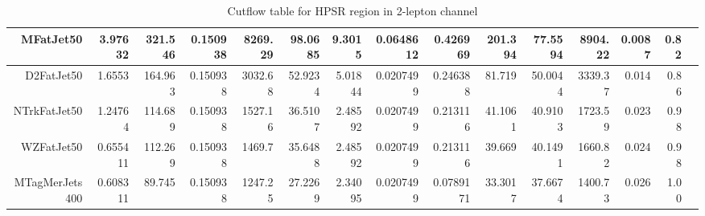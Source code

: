 \begin{table}[ht!]
\begin{center}
{\begin{tabular}{ r ||  r  r  r  r  r  r  r  r  r  || r r r r r |}
MFatJet50 & 3.97632 & 321.546 & 0.150938 & 8269.29 & 98.0685 & 9.3015 & 0.0648612 & 0.426969 & 201.394 & 77.5594 &8904.22&0.0087 & 0.82\tabularnewline \hline
D2FatJet50 & 1.6553 & 164.963 & 0.150938 & 3032.68 & 52.9234 & 5.01844 & 0.0207499 & 0.246388 & 81.719 & 50.0044 & 3339.37&0.014 & 0.86\tabularnewline \hline
NTrkFatJet50 & 1.24764 & 114.689 & 0.150938 & 1527.16 & 36.5107 & 2.48592 & 0.0207499 & 0.213116 & 41.1061 & 40.9103 &1723.59&0.023 & 0.98\tabularnewline \hline
WZFatJet50 & 0.655411 & 112.269 & 0.150938 & 1469.7 & 35.6488 & 2.48592 & 0.0207499 & 0.213116 & 39.669 & 40.1491 &1660.82&0.024 & 0.98\tabularnewline \hline
MTagMerJets400 & 0.608311 & 89.745 & 0.150938 & 1247.25 & 27.2269 & 2.34095 & 0.0207499 & 0.0789171 & 33.3017 & 37.6674 &1400.73&0.026 & 1.00\tabularnewline \hline
\end{tabular}
}
\caption{Cutflow table for HPSR region in 2-lepton channel}
\label{tab:2lep_HPSR}
\end{center}
\end{table}

